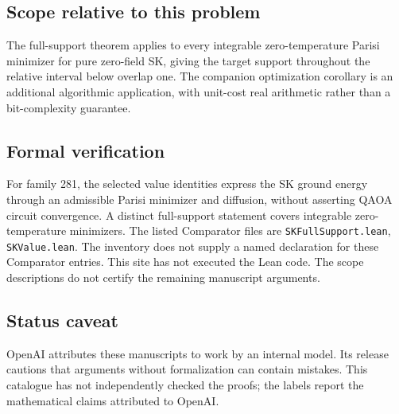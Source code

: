 \documentclass[11pt]{article}
\begin{document}
\subsection{Scope relative to this problem}
The full-support theorem applies to every integrable zero-temperature Parisi minimizer for pure zero-field SK, giving the target support throughout the relative interval below overlap one. The companion optimization corollary is an additional algorithmic application, with unit-cost real arithmetic rather than a bit-complexity guarantee.

\subsection{Formal verification}
For family 281, the selected value identities express the SK ground energy through an admissible Parisi minimizer and diffusion, without asserting QAOA circuit convergence. A distinct full-support statement covers integrable zero-temperature minimizers. The listed Comparator files are \texttt{SKFullSupport.lean}, \texttt{SKValue.lean}. The inventory does not supply a named declaration for these Comparator entries. This site has not executed the Lean code. The scope descriptions do not certify the remaining manuscript arguments.

\subsection{Status caveat}
OpenAI attributes these manuscripts to work by an internal model. Its release cautions that arguments without formalization can contain mistakes. This catalogue has not independently checked the proofs; the labels report the mathematical claims attributed to OpenAI.
\end{document}
